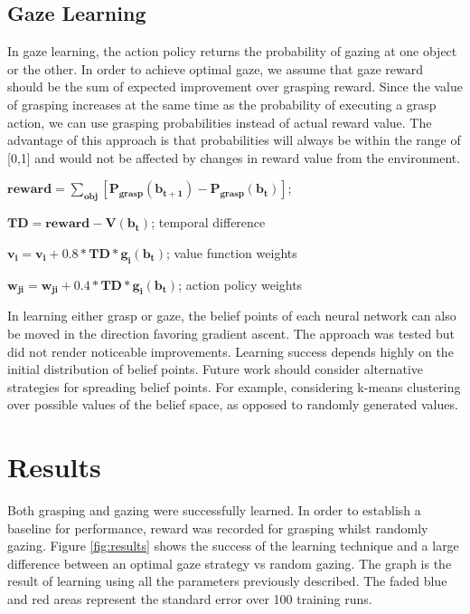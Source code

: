 \documentclass[11]{article}
\begin{document}
\subsection{Gaze Learning}
In gaze learning, the action policy returns the probability of gazing at one object or the other. In order to achieve optimal gaze, we assume that gaze reward should be the sum of expected improvement over grasping reward. Since the value of grasping increases at the same time as the probability of executing a grasp action, we can use grasping probabilities instead of actual reward value. The advantage of this approach is that probabilities will always be within the range of [0,1] and would not be affected by changes in reward value from the environment. 
\begin{list}{}{}
  \item $\pmb{reward = \sum_{obj}[P_{grasp}(b_{t+1}) -  P_{grasp}(b_t)] }$; 
  \item $\pmb{TD = reward - V(b_t)}$; temporal difference
  \item $\pmb{ v_i = v_i + 0.8 * TD * g_i(b_t)}$; value function weights
  \item $\pmb{w_{ji} = w_{ji}+ 0.4 * TD * g_i(b_t)}$; action policy weights
\end{list}  

In learning either grasp or gaze, the belief points of each neural network can also be moved in the direction favoring gradient ascent\cite{rashejrao}. The approach was tested but did not render noticeable improvements. Learning success depends highly on the initial distribution of belief points. Future work should consider alternative strategies for spreading belief points. For example, considering k-means clustering over possible values of the belief space, as opposed to randomly generated values.

\pagebreak

\section{Results}
Both grasping and gazing were successfully learned. In order to establish a baseline for performance, reward was recorded for grasping whilst randomly gazing. 
Figure \ref{fig:results} shows the success of the learning technique and a large difference between an optimal gaze strategy vs random gazing. The graph is the result of learning using all the parameters previously described. The faded blue and red areas represent the standard error over 100 training runs.
\end{document}
